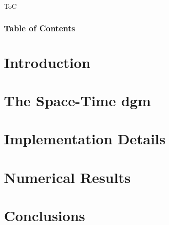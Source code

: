 
\begin{frame}{ToC}
    \frametitle{Table of Contents}

    \vspace*{\fill}
    \tableofcontents[hideallsubsections]
    \vspace*{\fill}
\end{frame}



\section{Introduction}




\section{The Space-Time \texorpdfstring{\acrlong{dgm}}{}}




\section{Implementation Details}




\section{Numerical Results}




\section{Conclusions}

